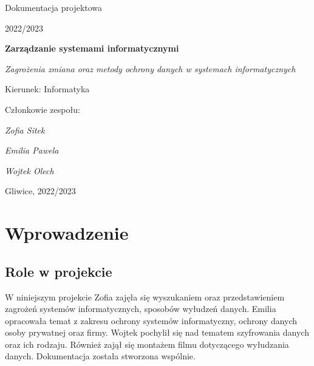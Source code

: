 \documentclass[12pt,a4paper]{article}
\begin{document}
\clearpage
\begin{figure}[h]
\centering
\end{figure}
\hspace{3cm}
\begin{center}Dokumentacja projektowa\end{center}
\begin{center}2022/2023\end{center}
\hspace{3cm}
\begin{center}\large\textbf{Zarządzanie systemami informatycznymi}\end{center}
\begin{center}\large\textit{Zagrożenia zmiana oraz metody ochrony danych w systemach informatycznych}\end{center}

\hspace{7cm}
\begin{flushright}Kierunek: Informatyka
\end{flushright}
\begin{flushright}Członkowie zespołu:
\par
\textit{Zofia Sitek}
\par
\textit{Emilia Pawela}
\par
\textit{Wojtek Olech}
\end{flushright}
\vfill
\begin{center}Gliwice, 2022/2023\end{center}

\newpage
{}
\tableofcontents

\newpage
\section{Wprowadzenie}










\subsection{Role w projekcie}
W niniejszym projekcie Zofia zajęła się wyszukaniem oraz przedstawieniem zagrożeń systemów informatycznych, sposobów wyłudzeń danych. Emilia opracowała temat z zakresu ochrony systemów informatyczny, ochrony danych osoby prywatnej oraz firmy. Wojtek pochylił się nad tematem szyfrowania danych oraz ich rodzaju. Również zajął się montażem filmu dotyczącego wyłudzania danych. Dokumentacja została stworzona wspólnie. 
\end{document}
